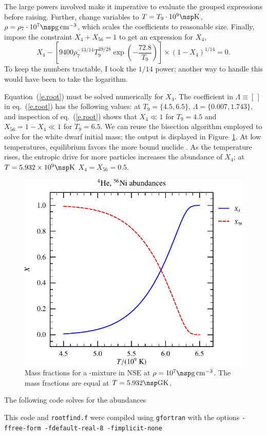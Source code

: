 \documentclass[11pt]{article}
\begin{document}
The large powers involved make it imperative to evaluate the grouped expressions before raising. Further, change variables to $T = T_{9}\cdot 10^{9}\nsp\K$, $\rho = \rho_{7}\cdot 10^{7}\nsp\grampercc$, which scales the coefficients to reasonable size. Finally, impose the constraint $X_{4} + X_{56} = 1$ to get an expression for $X_{4}$,
\begin{equation}\label{e.root}
X_{4} - \left[9400  \rho_{7}^{-13/14} T_{9}^{39/28}\exp\left(-\frac{72.8}{T_{9}}\right)\right] \times (1-X_{4})^{1/14} = 0.
\end{equation}
To keep the numbers tractable, I took the $1/14$ power; another way to handle this would have been to take the logarithm.

Equation~(\ref{e.root}) must be solved numerically for $X_{4}$.   The coefficient in $\Lambda \equiv [\,]$ in eq.~(\ref{e.root}) has the following values: at $T_{9} = \{4.5, 6.5\}$, $\Lambda = \{0.007,1.743\}$, and inspection of eq.~(\ref{e.root}) shows that $X_{4} \ll 1$ for $T_{9}=4.5$ and $X_{56} =1-X_{4}\ll 1$ for $T_{9} = 6.5$.
We can reuse the bisection algorithm employed to solve for the white dwarf initial mass; the output is displayed in Figure~\ref{f.nse}. At low temperatures, equilibrium favors the more bound nuclide \nickel[56]. As the temperature rises, the entropic drive for more particles increases the abundance of $X_{4}$; at $T = 5.932\ee{9}\nsp\K$ $X_{4}=X_{56}=0.5$.

\begin{figure}[htbp]
\includegraphics[width=5in]{plots_out/mass_fraction}
\caption{Mass fractions for a \helium-\nickel[56] mixture in NSE at $\rho = 10^{7}\nsp\grampercc$.  The mass fractions are equal at $T = 5.932\nsp\Giga\K$.\label{f.nse}}
\end{figure}
\clearpage

The following code solves for the abundances

This code and \verb|rootfind.f| were compiled using \verb|gfortran| with the options
\verb|-ffree-form -fdefault-real-8 -fimplicit-none|
\end{document}
